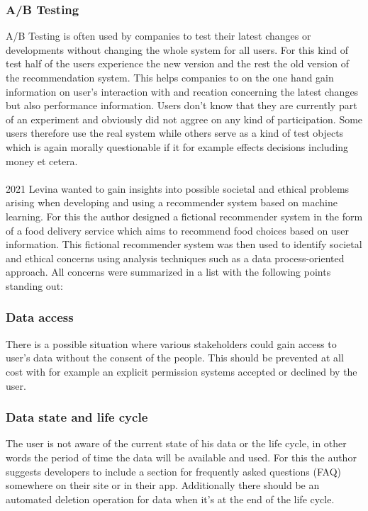 \documentclass[runningheads,a4paper]{llncs}
\begin{document}
\subsubsection{A/B Testing}
A/B Testing is often used by companies to test their latest changes or developments without changing the whole system for all users.
For this kind of test half of the users experience the new version and the rest the old version of the recommendation system.
This helps companies to on the one hand gain information on user's interaction with and recation concerning the latest changes but also performance information.
Users don't know that they are currently part of an experiment and obviously did not aggree on any kind of participation. 
Some users therefore use the real system while others serve as a kind of test objects which is again morally questionable if it for example effects decisions including money et cetera.\cite{paraschakis2016recommender}\\
\\
2021 Levina wanted to gain insights into possible societal and ethical problems arising when developing and using a recommender system based on machine learning.
For this the author designed a fictional recommender system in the form of a food delivery service which aims to recommend 
food choices based on user information. 
This fictional recommender system was then used to identify societal and ethical concerns using analysis techniques such as a data process-oriented approach.
All concerns were summarized in a list with the following points standing out:
\subsubsection{Data access}
There is a possible situation where various stakeholders could gain access to user's data without the consent of the people. This should be prevented at all cost with for example an explicit permission systems accepted or declined by the user.
\subsubsection{Data state and life cycle}
The user is not aware of the current state of his data or the life cycle, in other words the period of time the data will be available and used. 
For this the author suggests developers to include a section for frequently asked questions (FAQ) somewhere on their site or in their app.
Additionally there should be an automated deletion operation for data when it's at the end of the life cycle. 
\end{document}
